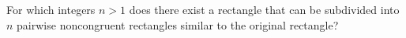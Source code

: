 For which integers $n>1$ does there exist a rectangle that can be subdivided into $n$ pairwise noncongruent rectangles similar to the original rectangle?